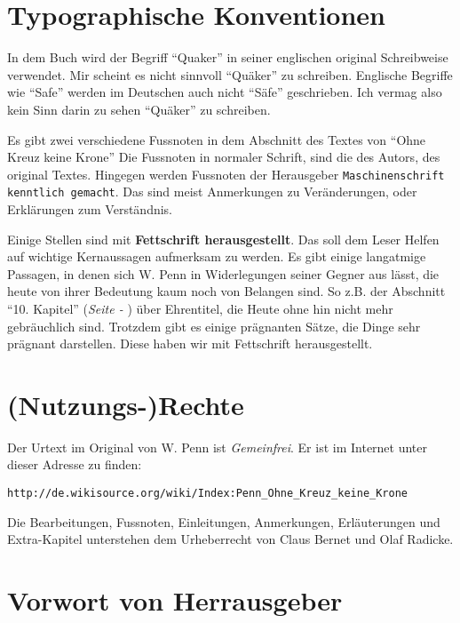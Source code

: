 \chapter{Typographische Konventionen}

In dem Buch wird der Begriff "`Quaker"'  in seiner
englischen original Schreibweise verwendet. Mir scheint es nicht sinnvoll
"`Quäker"' zu schreiben. Englische Begriffe wie "`Safe"' werden im Deutschen
auch nicht "`Säfe"' geschrieben. Ich vermag also kein Sinn darin zu sehen
"`Quäker"' zu schreiben.

\medskip

Es gibt zwei verschiedene Fussnoten in dem Abschnitt des Textes von "`Ohne Kreuz
keine Krone"' Die Fussnoten in normaler Schrift, sind die des Autors, des
original Textes. Hingegen werden Fussnoten der Herausgeber
\texttt{Maschinenschrift kenntlich gemacht}. Das sind meist Anmerkungen zu
Veränderungen, oder Erklärungen zum Verständnis.

\medskip

Einige Stellen sind mit \textbf{Fettschrift herausgestellt}. Das soll dem Leser
Helfen auf wichtige Kernaussagen aufmerksam zu werden. Es gibt einige langatmige
Passagen, in denen sich W. Penn in Widerlegungen seiner Gegner aus lässt, die
heute von ihrer Bedeutung kaum noch von Belangen sind. So z.B. der Abschnitt
"`10. Kapitel"' (\textit{Seite \pageref{kap10} - \pageref{kap10_ende}}) über
Ehrentitel, die Heute ohne hin nicht mehr gebräuchlich sind. Trotzdem gibt es
einige prägnanten Sätze, die Dinge sehr prägnant darstellen. Diese haben wir mit
Fettschrift herausgestellt.

\chapter{(Nutzungs-)Rechte}
Der Urtext im Original von W. Penn ist \textit{Gemeinfrei}. Er ist im Internet
unter dieser Adresse zu finden:

\begin{center}
\texttt{http://de.wikisource.org/wiki/Index:Penn\_Ohne\_Kreuz\_keine\_Krone}
\end{center}

Die Bearbeitungen, Fussnoten, Einleitungen, Anmerkungen, Erläuterungen und
Extra-Kapitel unterstehen dem Urheberrecht von Claus Bernet und Olaf Radicke.


\chapter{Vorwort von Herrausgeber}

